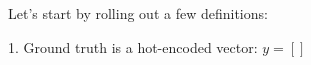 \documentclass[]{standalone}
\begin{document}
 
Let's start by rolling out a few definitions:

1. Ground truth is a hot-encoded vector: $y = \left[  \right] $
\end{document}
